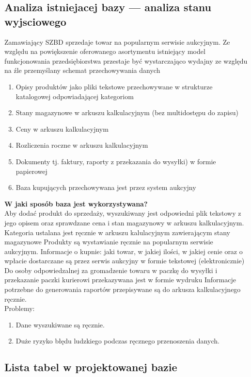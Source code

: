 \subsection{Analiza istniejacej bazy — analiza stanu wyjsciowego}
Zamawiający SZBD sprzedaje towar na popularnym serwisie aukcyjnym. 
Ze względu na powiększenie oferowanego asortymentu istniejący model funkcjonowania przedsiębiorstwa przestaje być wystarczająco wydajny 
ze względu na źle przemyślany schemat przechowywania danych
\begin{enumerate}
\item Opisy produktów jako pliki tekstowe przechowywane w strukturze katalogowej odpowiadającej kategoriom
\item Stany magazynowe w arkuszu kalkulacyjnym (bez multidostępu do zapisu)
\item Ceny w arkuszu kalkulacyjnym
\item Rozliczenia roczne w arkuszu kalkulacyjnym 
\item Dokumenty tj. faktury, raporty z przekazania do wysyłki) w formie papierowej
\item Baza kupujących przechowywana jest przez system aukcyjny	
\end{enumerate}
\textbf{W jaki sposób baza jest wykorzystywana?}\\
Aby dodać produkt do sprzedaży, wyszukiwany jest odpowiedni plik tekstowy z jego opisem oraz sprawdzane cena i stan magazynowy w arkuszu kalkulacyjnym.
Kategoria ustalana jest ręcznie w arkuszu kalulacyjnym zawierającym stany magazynowe
Produkty są wystawianie ręcznie na popularnym serwisie aukcyjnym.
Informacje o kupnie: jaki towar, w jakiej ilości, w jakiej cenie oraz o wpłacie dostarczane są przez serwis aukcyjny w formie tekstowej (elektronicznie)
Do osoby odpowiedzalnej za gromadzenie towaru w paczkę do wysyłki i przekazanie paczki kurierowi przekazywana jest w formie wydruku
Informacje potrzebne do generowania raportów przepisywane są do arkusza kalkulacyjnego ręcznie.\\
Problemy: 
\begin{enumerate}
	\item Dane wyszukiwane są ręcznie.
	\item Duże ryzyko błędu ludzkiego podczas ręcznego przenoszenia danych. 
\end{enumerate}


\subsection{Lista tabel w projektowanej bazie}

